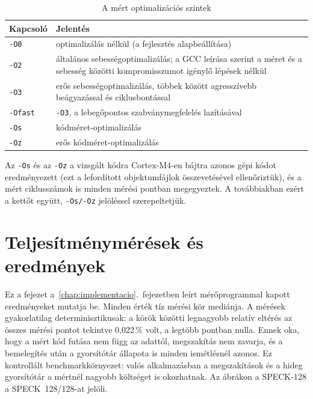 \documentclass[a4paper,12pt]{report}
\theoremstyle{definition}
\theoremstyle{remark}
\begin{document}
\begin{table}[htbp]
    \centering
    \small
    \caption{A mért optimalizációs szintek}
    \label{tab:build_config}
    \begin{tabular}{|l|p{11cm}|}
        \hline
        \textbf{Kapcsoló} & \textbf{Jelentés} \\ \hline
        \texttt{-O0} & optimalizálás nélkül (a fejlesztés alapbeállítása) \\ \hline
        \texttt{-O2} & általános sebességoptimalizálás; a GCC leírása szerint a méret és a sebesség közötti kompromisszumot igénylő lépések nélkül \\ \hline
        \texttt{-O3} & erős sebességoptimalizálás, többek között agresszívebb beágyazással és ciklusbontással \\ \hline
        \texttt{-Ofast} & \texttt{-O3}, a lebegőpontos szabványmegfelelés lazításával \\ \hline
        \texttt{-Os} & kódméret-optimalizálás \\ \hline
        \texttt{-Oz} & erős kódméret-optimalizálás \\ \hline
    \end{tabular}
\end{table}

Az \texttt{-Os} és az \texttt{-Oz} a vizsgált kódra Cortex-M4-en bájtra azonos gépi kódot eredményezett (ezt a lefordított objektumfájlok összevetésével ellenőriztük), és a mért ciklusszámok is minden mérési pontban megegyeztek. A továbbiakban ezért a kettőt együtt, \texttt{-Os/-Oz} jelöléssel szerepeltetjük.

\chapter{Teljesítménymérések és eredmények}\label{chap:meresek}

Ez a fejezet a~\ref{chap:implementacio}.~fejezetben leírt mérőprogrammal kapott eredményeket mutatja be. Minden érték tíz mérési kör mediánja. A mérések gyakorlatilag determinisztikusak: a körök közötti legnagyobb relatív eltérés az összes mérési pontot tekintve 0,022\,\% volt, a legtöbb pontban nulla. Ennek oka, hogy a mért kód futása nem függ az adattól, megszakítás nem zavarja, és a bemelegítés után a gyorsítótár állapota is minden ismétlésnél azonos. Ez kontrollált benchmarkkörnyezet: valós alkalmazásban a megszakítások és a hideg gyorsítótár a mértnél nagyobb költséget is okozhatnak. Az ábrákon a SPECK-128 a SPECK~128/128-at jelöli.
\end{document}
